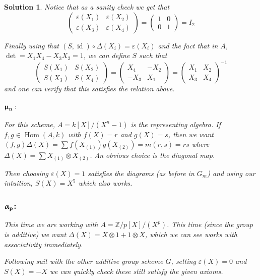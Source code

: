 \documentclass[12pt]{article}
\theoremstyle{nonumberbreak}
\newtheorem{sol}{Solution}
\theoremstyle{changebreak}
\theoremstyle{nonumberplain}
\theoremstyle{change}
\newcommand*{\bbZ}{\mathbb{Z}}
\DeclareMathOperator{\Hom}{Hom}
\newcommand*{\mun}[1]{\ensuremath\mathbf{\bm\upmu_#1}}
\newcommand*{\alp}[1]{\ensuremath\mathbf{\bm\upalpha_#1}}
\DeclareMathOperator{\id}{id}
\begin{document}
\begin{sol}
	Notice that as a sanity check we get that 
	\[\begin{pmatrix}
		\varepsilon(X_1) & \varepsilon(X_2)\\
		\varepsilon(X_3) & \varepsilon(X_4)
	\end{pmatrix}=\begin{pmatrix}
		1 & 0\\
		0 & 1
	\end{pmatrix}=I_2\]

	Finally using that $(S,\id)\circ\Delta(X_i)=\varepsilon(X_i)$ and the fact that in $A$,
	$\det=X_1X_4-X_3X_2=1$, we can define $S$ such that
	\[\begin{pmatrix}
		S(X_1) & S(X_2)\\
		S(X_3) & S(X_4)
	\end{pmatrix}=\begin{pmatrix}
		X_4 & -X_2\\
		-X_3 & X_1
	\end{pmatrix}=\begin{pmatrix}
		X_1 & X_2\\
		X_3 & X_4
	\end{pmatrix}^{-1}\]
	and one can verify that this satisfies the relation above.
	\subsubsection*{$\mun{n}:$}
	For this scheme, $A=k[X]/(X^n-1)$ is the representing algebra. If $f,g\in\Hom(A,k)$ with
	$f(X)=r$ and $g(X)=s$, then we want $(f,g)\Delta(X)=\sum f(X_{(1)})g(X_{(2)})=m(r,s)=rs$ where 
	$\Delta(X)=\sum X_{(1)}\otimes X_{(2)}$. An obvious choice is the diagonal map.

	Then choosing $\varepsilon(X)=1$ satisfies the diagrams (as before in $G_m$) and using our
	intuition, $S(X)=X^5$ which also works.
	\subsubsection*{$\alp{p}$:}
	This time we are working with $A=\bbZ/p[X]/(X^p)$. This time (since the group is additive) we want
	$\Delta(X)=X\otimes 1+1\otimes X$, which we can see works with associativity immediately.

	Following suit with the other additive group scheme $G$, setting $\varepsilon(X)=0$ and $S(X)=-X$
	we can quickly check these still satisfy the given axioms.
\end{sol}
\end{document}
